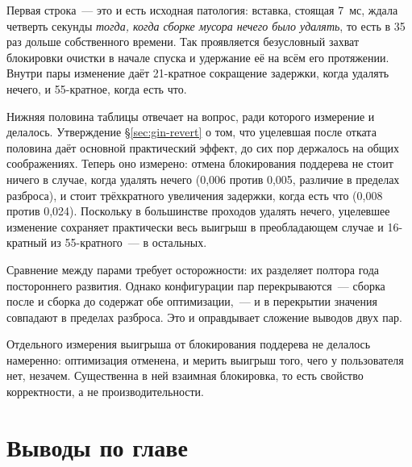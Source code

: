 Первая строка~--- это и есть исходная патология: вставка, стоящая 7~мс, ждала
четверть секунды \emph{тогда, когда сборке мусора нечего было удалять}, то есть
в 35 раз дольше собственного времени. Так проявляется безусловный захват
блокировки очистки в начале спуска и удержание её на всём его протяжении.
Внутри пары изменение даёт 21-кратное сокращение задержки, когда удалять
нечего, и 55-кратное, когда есть что.

Нижняя половина таблицы отвечает на вопрос, ради которого измерение и делалось.
Утверждение §\ref{sec:gin-revert} о том, что уцелевшая после отката половина
даёт основной практический эффект, до сих пор держалось на общих соображениях.
Теперь оно измерено: отмена блокирования поддерева не стоит ничего в случае,
когда удалять нечего (0,006 против 0,005, различие в пределах разброса), и
стоит трёхкратного увеличения задержки, когда есть что (0,008 против 0,024).
Поскольку в большинстве проходов удалять нечего, уцелевшее изменение сохраняет
практически весь выигрыш в преобладающем случае и 16-кратный из 55-кратного~---
в остальных.

Сравнение между парами требует осторожности: их разделяет полтора года
постороннего развития. Однако конфигурации пар перекрываются~--- сборка после
 и сборка до  содержат обе оптимизации,~---
и в перекрытии значения совпадают в пределах разброса. Это и оправдывает
сложение выводов двух пар.

Отдельного измерения выигрыша от блокирования поддерева не делалось намеренно:
оптимизация отменена, и мерить выигрыш того, чего у пользователя нет, незачем.
Существенна в ней взаимная блокировка, то есть свойство корректности, а не
производительности.

\section{Выводы по главе}

